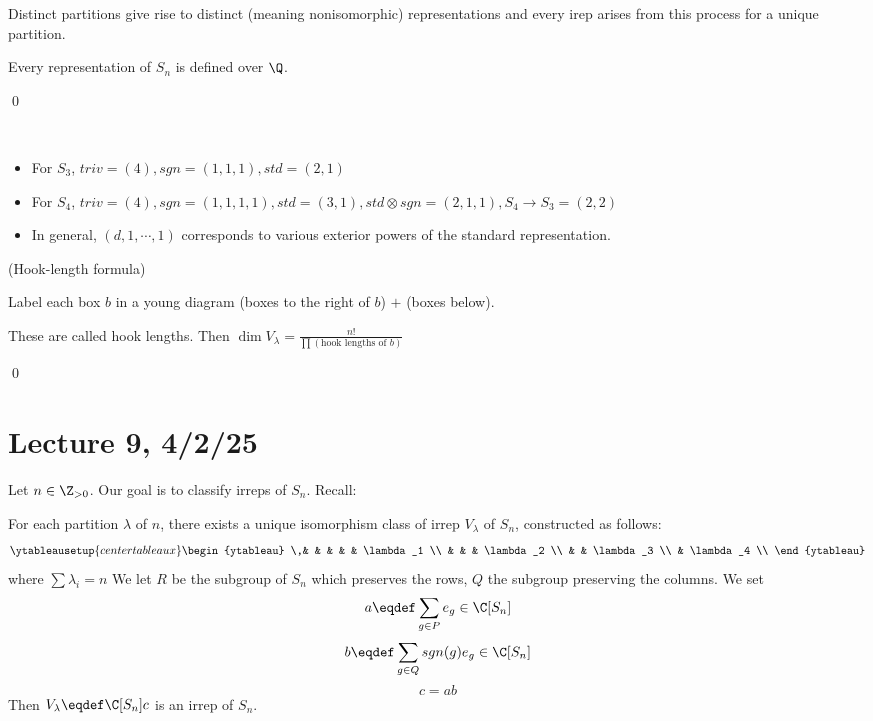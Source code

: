 \documentclass[x11names,reqno,14pt]{extarticle}
\begin{document}
Distinct partitions give rise to distinct (meaning nonisomorphic) representations and every irep arises from this process for a unique partition.

\cor

Every representation of $S_n$ is defined over $\Q$.

\proof

\qed

\exm
\,
\begin{itemize}

\item For $S_3$, $triv = (4), sgn = (1,1,1), std = (2,1)$ 

\item For $S_4$, $triv = (4), sgn = (1,1,1,1), std = (3, 1), std \otimes sgn = (2,1,1), S_4 \to S_3 = (2,2)$ 

\item In general, $(d,1,\cdots,1)$ corresponds to various exterior powers of the standard representation.

\end{itemize}

\thm(Hook-length formula)

Label each box $b$ in a young diagram (boxes to the right of $b$) $+$ (boxes below). 

These are called hook lengths. Then $\dim V_\lambda = \frac{n!}{\prod (\text{hook lengths of $b$})}$

\proof

\qed

\section*{Lecture 9, 4/2/25}

Let $n \in \Z_{>0}$. Our goal is to classify irreps of $S_n$. Recall:

\thm

For each partition $\lambda$ of $n$, there exists a unique isomorphism class of irrep $V_\lambda$ of $S_n$, constructed as follows: 
\[
\ytableausetup{centertableaux}
\begin{ytableau}
\,& & & & & \lambda_1 \\
& & & \lambda_2 \\
& & \lambda_3 \\
& \lambda_4 \\
\end{ytableau}
\]
where $\sum\lambda_i = n$
We let $R$ be the subgroup of $S_n$ which preserves the rows, $Q$ the subgroup preserving the columns. We set
\[
a\eqdef \sum_{g\in P}e_g \in \C[S_n]
\]
\[
b\eqdef \sum_{g\in Q}sgn(g)e_g \in \C[S_n]
\]
\[
c = ab
\]
Then $V_\lambda \eqdef \C[S_n]c$ is an irrep of $S_n$. 
\end{document}
